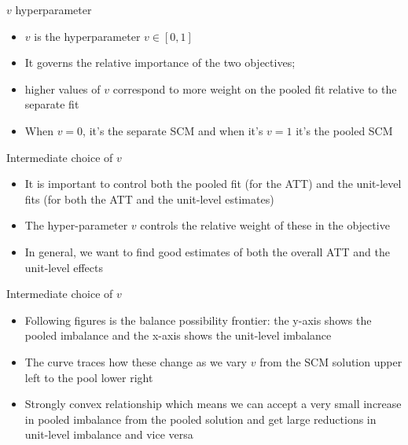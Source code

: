 \documentclass{beamer}
\begin{document}
\begin{frame}{$v$ hyperparameter}

\begin{itemize}

\item $v$ is the hyperparameter $v \in [0,1]$
\item It governs the relative importance of the two objectives; 
\item higher values of $v$ correspond to more weight on the pooled fit relative to the separate fit
\item When $v=0$, it's the separate SCM and when it's $v=1$ it's the pooled SCM
\end{itemize}

\end{frame}



\begin{frame}{Intermediate choice of $v$}

\begin{itemize}

\item It is important to control both the pooled fit (for the ATT) and the unit-level fits (for both the ATT and the unit-level estimates)
\item The hyper-parameter $v$ controls the relative weight of these in the objective
\item In general, we want to find good estimates of both the overall ATT and the unit-level effects

\end{itemize}

\end{frame}

\begin{frame}{Intermediate choice of $v$}

\begin{itemize}

\item Following figures is the balance possibility frontier: the y-axis shows the pooled imbalance and the x-axis shows the unit-level imbalance
\item The curve traces how these change as we vary $v$ from the SCM solution upper left to the pool lower right
\item Strongly convex relationship which means we can accept a very small increase in pooled imbalance from the pooled solution and get large reductions in unit-level imbalance and vice versa

\end{itemize}

\end{frame}
\end{document}

